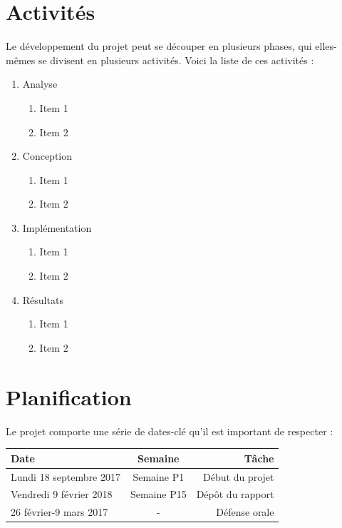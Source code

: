 \section{Activités}

Le développement du projet peut se découper en plusieurs phases, qui elles-mêmes se divisent en plusieurs activités. Voici la liste de ces activités :

\begin{enumerate}
	\item Analyse
	\begin{enumerate}
		\item Item 1
		\item Item 2
	\end{enumerate}
	\item Conception
	\begin{enumerate}
		\item Item 1
		\item Item 2
	\end{enumerate}
	\item Implémentation
	\begin{enumerate}
		\item Item 1
		\item Item 2
	\end{enumerate}
	\item Résultats
	\begin{enumerate}
		\item Item 1
		\item Item 2
	\end{enumerate}
\end{enumerate}

\section{Planification}
Le projet comporte une série de dates-clé qu’il est important de respecter :
\begin{center}
   \begin{tabular}{ | l | c | r | }
     \hline
		Date & Semaine & Tâche \\ \hline
		\color{red}Lundi 18 septembre 2017 & Semaine P1 & Début du projet \\ \hline
		\color{red}Vendredi 9 février 2018 & Semaine P15 & Dépôt du rapport \\ \hline
		\color{red}26 février-9 mars 2017 & - & Défense orale \\ \hline
     \hline
   \end{tabular}
\end{center}

